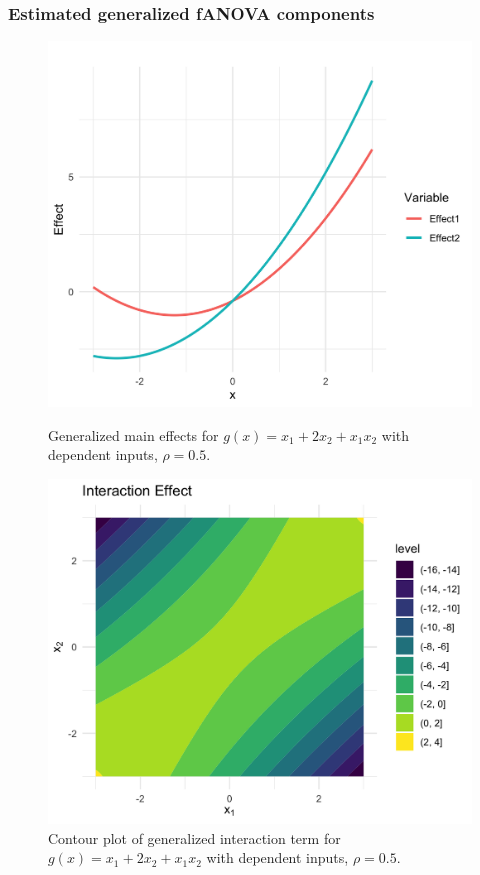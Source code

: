\subsubsection*{Estimated generalized fANOVA components}
\begin{figure}[htpb]
    \centering
    \begin{minipage}[t]{0.49\textwidth}
        \centering
        \includegraphics[width=\textwidth]{images/gpt_func_main.png}
        \caption{Generalized main effects for $g(x) = x_1 + 2 x_2 + x_1 x_2$ with dependent inputs, $\rho = 0.5$.}
        \label{fig:dep_150_main}
    \end{minipage}%
    \hfill
    \begin{minipage}[t]{0.49\textwidth}
        \centering
        \includegraphics[width=\textwidth]{images/gpt_func_interaction.png}
        \caption{Contour plot of generalized interaction term for $g(x) = x_1 + 2 x_2 + x_1 x_2$ with dependent inputs, $\rho = 0.5$.}
        \label{fig:dep_150_interact}
    \end{minipage}
\end{figure}

